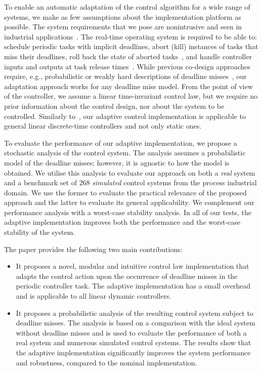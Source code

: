 To enable an automatic adaptation of the control algorithm for a wide range of systems, we make as few assumptions about the implementation platform as possible.
The system requirements that we pose are nonintrusive and seen in industrial applications~\cite{akesson:2020}.
The real-time operating system is required to be able to: schedule periodic tasks with implicit deadlines, abort (kill) instances of tasks that miss their deadlines, roll back the state of aborted tasks~\cite{Zhang:2003,Seong:2001}, and handle controller inputs and outputs at task release times~\cite{Kirsch:2012, Ernst:2018}.
While previous co-design approaches require, e.g., probabilistic or weakly hard descriptions of deadline misses~\cite{Pazzaglia:2019,Chakraborty:2014}, our adaptation approach works for any deadline miss model.
From the point of view of the controller, we assume a linear time-invariant control law, but we require no prior information about the control design, nor about the system to be controlled.
Similarly to~\cite{Pazzaglia:2021}, our adaptive control implementation is applicable to general linear discrete-time controllers and not only static ones.

To evaluate the performance of our adaptive implementation, we propose a stochastic analysis of the control system.
The analysis assumes a probabilistic model of the deadline misses; however, it is agnostic to how the model is obtained.
We utilise this analysis to evaluate our approach on both a \emph{real} system and a benchmark set of $268$ \emph{simulated} control systems from the process industrial domain.
We use the former to evaluate the practical relevance of the proposed approach and the latter to evaluate its general applicability.
We complement our performance analysis with a worst-case stability analysis.
In all of our tests, the adaptive implementation improves both the performance and the worst-case stability of the system.

The paper provides the following two main contributions:
\begin{itemize}
    \item It proposes a novel, modular and intuitive control law implementation that adapts the control action upon the occurrence of deadline misses in the periodic controller task. The adaptive implementation has a small overhead and is applicable to all linear dynamic controllers.
    \item It proposes a probabilistic analysis of the resulting control system subject to deadline misses.
    The analysis is based on a comparison with the ideal system without deadline misses and is used to evaluate the performance of both a real system and numerous simulated control systems.
    The results show that the adaptive implementation significantly improves the system performance and robustness, compared to the nominal implementation.
\end{itemize}

